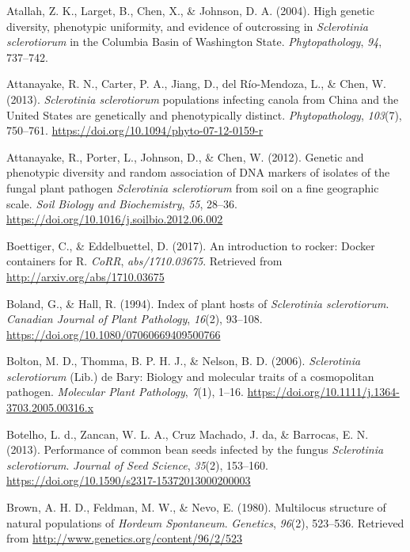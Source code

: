 \hypertarget{ref-atallah2004high}{}
Atallah, Z. K., Larget, B., Chen, X., \& Johnson, D. A. (2004). High
genetic diversity, phenotypic uniformity, and evidence of outcrossing in
\emph{Sclerotinia sclerotiorum} in the Columbia Basin of Washington
State. \emph{Phytopathology}, \emph{94}, 737--742.

\hypertarget{ref-attanayake2013sclerotinia}{}
Attanayake, R. N., Carter, P. A., Jiang, D., del Río-Mendoza, L., \&
Chen, W. (2013). \emph{Sclerotinia sclerotiorum} populations infecting
canola from China and the United States are genetically and
phenotypically distinct. \emph{Phytopathology}, \emph{103}(7), 750--761.
\url{https://doi.org/10.1094/phyto-07-12-0159-r}

\hypertarget{ref-attanayake2012genetic}{}
Attanayake, R., Porter, L., Johnson, D., \& Chen, W. (2012). Genetic and
phenotypic diversity and random association of DNA markers of isolates
of the fungal plant pathogen \emph{Sclerotinia sclerotiorum} from soil
on a fine geographic scale. \emph{Soil Biology and Biochemistry},
\emph{55}, 28--36. \url{https://doi.org/10.1016/j.soilbio.2012.06.002}

\hypertarget{ref-boettiger2017introduction}{}
Boettiger, C., \& Eddelbuettel, D. (2017). An introduction to rocker:
Docker containers for R. \emph{CoRR}, \emph{abs/1710.03675}. Retrieved
from \url{http://arxiv.org/abs/1710.03675}

\hypertarget{ref-boland1994index}{}
Boland, G., \& Hall, R. (1994). Index of plant hosts of
\emph{Sclerotinia sclerotiorum}. \emph{Canadian Journal of Plant
Pathology}, \emph{16}(2), 93--108.
\url{https://doi.org/10.1080/07060669409500766}

\hypertarget{ref-bolton2006sclerotinia}{}
Bolton, M. D., Thomma, B. P. H. J., \& Nelson, B. D. (2006).
\emph{Sclerotinia sclerotiorum} (Lib.) de Bary: Biology and molecular
traits of a cosmopolitan pathogen. \emph{Molecular Plant Pathology},
\emph{7}(1), 1--16.
\url{https://doi.org/10.1111/j.1364-3703.2005.00316.x}

\hypertarget{ref-botelho2013performance}{}
Botelho, L. d., Zancan, W. L. A., Cruz Machado, J. da, \& Barrocas, E.
N. (2013). Performance of common bean seeds infected by the fungus
\emph{Sclerotinia sclerotiorum}. \emph{Journal of Seed Science},
\emph{35}(2), 153--160.
\url{https://doi.org/10.1590/s2317-15372013000200003}

\hypertarget{ref-brown1980multilocus}{}
Brown, A. H. D., Feldman, M. W., \& Nevo, E. (1980). Multilocus
structure of natural populations of \emph{Hordeum Spontaneum}.
\emph{Genetics}, \emph{96}(2), 523--536. Retrieved from
\url{http://www.genetics.org/content/96/2/523}

